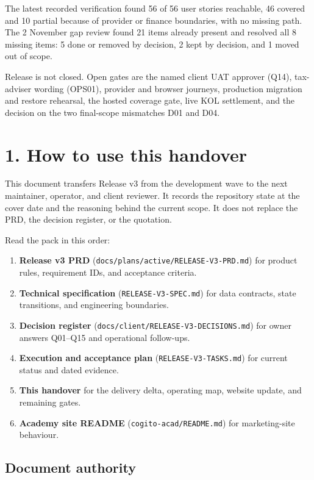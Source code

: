 \documentclass[11pt,a4paper]{article}
\newcommand{\code}[1]{\texttt{#1}}
\begin{document}
The latest recorded verification found 56 of 56 user stories reachable, 46 covered and 10 partial because of provider or finance boundaries, with no missing path. The 2 November gap review found 21 items already present and resolved all 8 missing items: 5 done or removed by decision, 2 kept by decision, and 1 moved out of scope.

Release is not closed. Open gates are the named client UAT approver (Q14), tax-adviser wording (OPS01), provider and browser journeys, production migration and restore rehearsal, the hosted coverage gate, live KOL settlement, and the decision on the two final-scope mismatches D01 and D04.

\newpage
\tableofcontents
\newpage

\section{1. How to use this handover}

This document transfers Release v3 from the development wave to the next maintainer, operator, and client reviewer. It records the repository state at the cover date and the reasoning behind the current scope. It does not replace the PRD, the decision register, or the quotation.

Read the pack in this order:

\begin{enumerate}
	\item \textbf{Release v3 PRD} (\code{docs/plans/active/RELEASE-V3-PRD.md}) for product rules, requirement IDs, and acceptance criteria.
	\item \textbf{Technical specification} (\code{RELEASE-V3-SPEC.md}) for data contracts, state transitions, and engineering boundaries.
	\item \textbf{Decision register} (\code{docs/client/RELEASE-V3-DECISIONS.md}) for owner answers Q01--Q15 and operational follow-ups.
	\item \textbf{Execution and acceptance plan} (\code{RELEASE-V3-TASKS.md}) for current status and dated evidence.
	\item \textbf{This handover} for the delivery delta, operating map, website update, and remaining gates.
	\item \textbf{Academy site README} (\code{cogito-acad/README.md}) for marketing-site behaviour.
\end{enumerate}

\subsection{Document authority}
\end{document}
